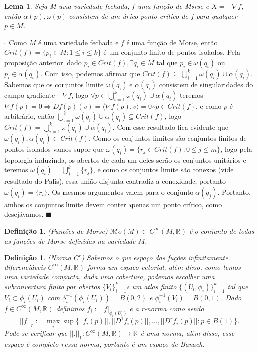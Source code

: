 \documentclass[12pt]{book}
\newtheorem{lema}[teorema]{Lema}
\newtheorem{definicao}[teorema]{Definição}
\newenvironment{prova}[1]{$\square$ #1}{\hfill$\blacksquare$}
\newcommand{\funcoessuaves}[1]{C^{\infty}(#1, \real{})}
\newcommand{\produtointerno}[2]{\langle #1, #2 \rangle}
\newcommand{\real}[1]{\mathbb{R}^{#1}}
\newcommand{\morsefunc}[1]{\mathcal{M}o(#1)}
\begin{document}
	\begin{lema}
		Seja M uma variedade fechada, $f$ uma função de Morse e $X =-\nabla f$, então $\alpha(p), \omega(p)$ consistem de um único ponto crítico de $f$ para qualquer $p \in M$.
	\end{lema}
	\begin{prova}
		Como $M$ é uma variedade fechada e $f$ é uma função de Morse, então $Crit(f) = \{p_{i} \in M: 1\leq i \leq k \}$ é um conjunto finito de pontos isolados. Pela proposição anterior, dado $p_{i} \in Crit(f), \exists q_{i} \in M$ tal que $p_{i} \in \omega(q_{i})$ ou $p_{i} \in \alpha(q_{i})$. Com isso, podemos afirmar que $Crit(f) \subseteq \bigcup_{i=1}^{k}\omega(q_{i}) \cup \alpha(q_{i})$. Sabemos que os conjuntos limite $\omega(q_{i})$ e $\alpha(q_{i})$ consistem de singularidades do campo gradiente $-\nabla f$, logo $\forall p \in \bigcup_{i=1}^{k}\omega(q_{i}) \cup \alpha(q_{i})$ teremos $\nabla f(p) = 0 \Rightarrow Df(p)(v) = \produtointerno{\nabla f(p)}{v} = 0 \therefore p \in Crit(f)$, e como $p$ é arbitrário, então $\bigcup_{i=1}^{k}\omega(q_{i}) \cup \alpha(q_{i}) \subseteq Crit(f)$, logo $Crit(f) = \bigcup_{i=1}^{k}\omega(q_{i}) \cup \alpha(q_{i})$. Com esse resultado fica evidente que $\omega(q_{i}), \alpha(q_{i}) \subset Crit(f)$. Como os conjuntos limites são conjuntos finitos de pontos isolados vamos supor que $\omega(q_{i}) = \{r_{j} \in Crit(f): 0\leq j \leq m\}$, logo pela topologia induzinda, os abertos de cada um deles serão os conjuntos unitários e teremos $\omega(q_{i}) = \bigcup_{j=1}^{k} \{r_{j}\} $, e como os conjuntos limite são conexos (vide resultado do Palis), essa união disjunta contradiz a conexidade, portanto $\omega(q_{i}) = \{r_{i}\}$. Os mesmos argumentos valem para o conjunto $\alpha(q_{j})$. Portanto, ambos os conjuntos limite devem conter apenas um ponto crítico, como desejávamos.
	\end{prova}
	
	\begin{definicao}
		(Funções de Morse) $\morsefunc{M} \subset \funcoessuaves{M}$ é o conjunto de todas as funções de Morse definidas na variedade $M$.
	\end{definicao}
	
	\begin{definicao}
		(Norma $C^{r}$) Sabemos o que espaço das fuções infinitamente diferenciáveis $\funcoessuaves{M}$ forma um espaço vetorial, além disso, como temos uma variedade compacta, dada uma cobertura, podemos escolher uma subconvertura finita por abertos $\{V_{i}\}_{i=1}^{k}$e um atlas finito $\{(U_{i}, \phi_{i})\}_{i=1}^{k}$ tal que $V_{i} \subset \phi_{i}(U_{i})$ com $\phi_{i}^{-1}(\phi_{i}(U_{i})) = B(0,2)$ e $\phi_{i}^{-1}(V_{i}) = B(0,1)$. Dado $f \in \funcoessuaves{M}$ definimos $f_{i} := f|_{\phi_{i}(U_{i})}$ e a \textit{r-norma} como sendo 
		$$
		||f||_{r} := \max_{i} \sup\{||f_{i}(p)||, ||D^{1}f_{i}(p)||, \dots, ||D^{r}f_{i}(p)||: p \in B(1)\}.
		$$
		Pode-se verificar que $||.||_{1}: \funcoessuaves{M} \to \real{}$ é uma norma, além disso, esse espaço é completo nessa norma, portanto é um \textit{espaço de Banach}.
	\end{definicao}
	
\end{document}
